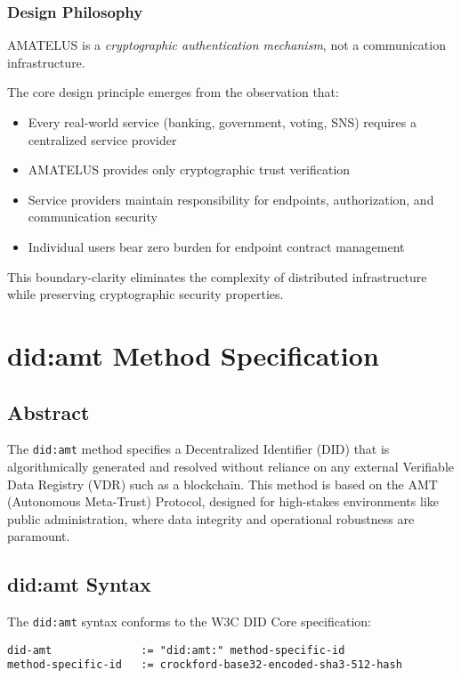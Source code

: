 \subsection{Design Philosophy}

AMATELUS is a \emph{cryptographic authentication mechanism}, not a communication infrastructure.

The core design principle emerges from the observation that:
\begin{itemize}
  \item Every real-world service (banking, government, voting, SNS) requires a centralized service provider
  \item AMATELUS provides only cryptographic trust verification
  \item Service providers maintain responsibility for endpoints, authorization, and communication security
  \item Individual users bear zero burden for endpoint contract management
\end{itemize}

This boundary-clarity eliminates the complexity of distributed infrastructure while preserving cryptographic security properties.

\chapter{did:amt Method Specification}

\section{Abstract}

The \texttt{did:amt} method specifies a Decentralized Identifier (DID) that is algorithmically generated and resolved without reliance on any external Verifiable Data Registry (VDR) such as a blockchain. This method is based on the AMT (Autonomous Meta-Trust) Protocol, designed for high-stakes environments like public administration, where data integrity and operational robustness are paramount.

\section{did:amt Syntax}

The \texttt{did:amt} syntax conforms to the W3C DID Core specification:

\begin{verbatim}
did-amt              := "did:amt:" method-specific-id
method-specific-id   := crockford-base32-encoded-sha3-512-hash
\end{verbatim}

